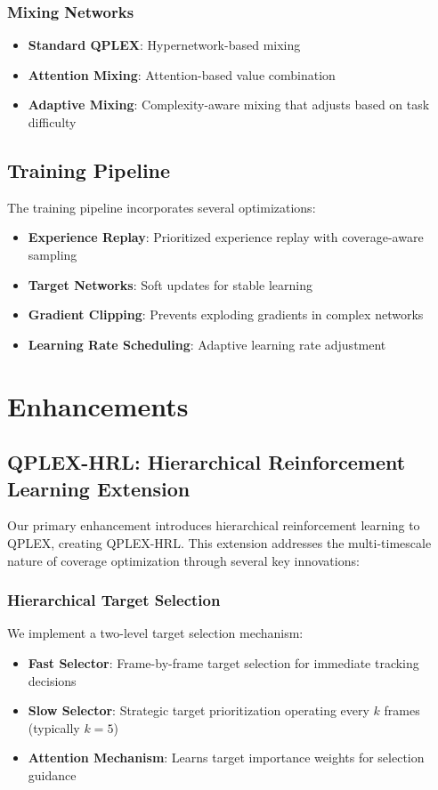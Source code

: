 \documentclass[conference]{IEEEtran}
\begin{document}
\subsubsection{Mixing Networks}
\begin{itemize}
\item \textbf{Standard QPLEX}: Hypernetwork-based mixing
\item \textbf{Attention Mixing}: Attention-based value combination
\item \textbf{Adaptive Mixing}: Complexity-aware mixing that adjusts based on task difficulty
\end{itemize}

\subsection{Training Pipeline}
The training pipeline incorporates several optimizations:
\begin{itemize}
\item \textbf{Experience Replay}: Prioritized experience replay with coverage-aware sampling
\item \textbf{Target Networks}: Soft updates for stable learning
\item \textbf{Gradient Clipping}: Prevents exploding gradients in complex networks
\item \textbf{Learning Rate Scheduling}: Adaptive learning rate adjustment
\end{itemize}

\section{Enhancements}

\subsection{QPLEX-HRL: Hierarchical Reinforcement Learning Extension}

Our primary enhancement introduces hierarchical reinforcement learning to QPLEX, creating QPLEX-HRL. This extension addresses the multi-timescale nature of coverage optimization through several key innovations:

\subsubsection{Hierarchical Target Selection}
We implement a two-level target selection mechanism:
\begin{itemize}
\item \textbf{Fast Selector}: Frame-by-frame target selection for immediate tracking decisions
\item \textbf{Slow Selector}: Strategic target prioritization operating every $k$ frames (typically $k=5$)
\item \textbf{Attention Mechanism}: Learns target importance weights for selection guidance
\end{itemize}
\end{document}
